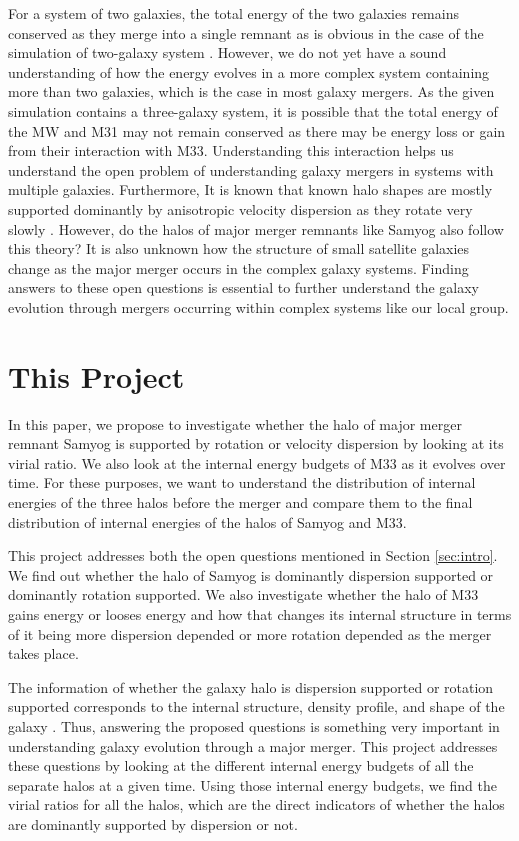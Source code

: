 \documentclass[twocolumn]{aastex631}
\begin{document}
For a system of two galaxies, the total energy of the two galaxies remains conserved as they merge into a single remnant as is obvious in the case of the simulation of two-galaxy system \citep{same_mass_merger_1}. However, we do not yet have a sound understanding of how the energy evolves in a more complex system containing more than two galaxies, which is the case in most galaxy mergers. As the given simulation contains a three-galaxy system, it is possible that the total energy of the MW and M31 may not remain conserved as there may be energy loss or gain from their interaction with M33. Understanding this interaction helps us understand the open problem of understanding galaxy mergers in systems with multiple galaxies. Furthermore, It is known that known halo shapes are mostly supported dominantly by anisotropic velocity dispersion as they rotate very slowly \citep{spin_param_explain}. However, do the halos of major merger remnants like Samyog also follow this theory? It is also unknown how the structure of small satellite galaxies change as the major merger occurs in the complex galaxy systems. Finding answers to these open questions is essential to further understand the galaxy evolution through mergers occurring within complex systems like our local group. 

\section{This Project}
\label{sec:proj}
In this paper, we propose to investigate whether the halo of major merger remnant Samyog is supported by rotation or velocity dispersion by looking at its virial ratio. We also look at the internal energy budgets of M33 as it evolves over time. For these purposes, we want to understand the distribution of internal energies of the three halos before the merger and compare them to the final distribution of internal energies of the halos of Samyog and M33. 

This project addresses both the open questions mentioned in Section \ref{sec:intro}. We find out whether the halo of Samyog is dominantly dispersion supported or dominantly rotation supported. We also investigate whether the halo of M33 gains energy or looses energy and how that changes its internal structure in terms of it being more dispersion depended or more rotation depended as the merger takes place.

The information of whether the galaxy halo is dispersion supported or rotation supported corresponds to the internal structure, density profile, and shape of the galaxy \citep{same_mass_merger_1, same_mass_merger_2}. Thus, answering the proposed questions is something very important in understanding galaxy evolution through a major merger. This project addresses these questions by looking at the different internal energy budgets of all the separate halos at a given time. Using those internal energy budgets, we find the virial ratios for all the halos, which are the direct indicators of whether the halos are dominantly supported by dispersion or not.   
\end{document}
